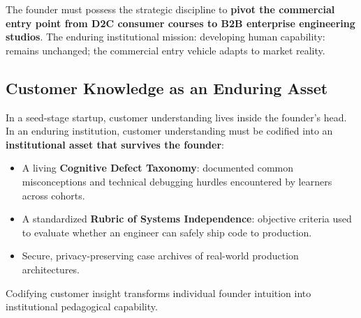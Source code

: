 The founder must possess the strategic discipline to \textbf{pivot the commercial entry point from D2C consumer courses to B2B enterprise engineering studios}. The enduring institutional mission: developing human capability: remains unchanged; the commercial entry vehicle adapts to market reality.

\subsection{Customer Knowledge as an Enduring Asset}

In a seed-stage startup, customer understanding lives inside the founder's head. In an enduring institution, customer understanding must be codified into an \textbf{institutional asset that survives the founder}:
\begin{itemize}[leftmargin=1.2em,itemsep=0.2ex]
  \item A living \textbf{Cognitive Defect Taxonomy}: documented common misconceptions and technical debugging hurdles encountered by learners across cohorts.
  \item A standardized \textbf{Rubric of Systems Independence}: objective criteria used to evaluate whether an engineer can safely ship code to production.
  \item Secure, privacy-preserving case archives of real-world production architectures.
\end{itemize}
Codifying customer insight transforms individual founder intuition into institutional pedagogical capability.
